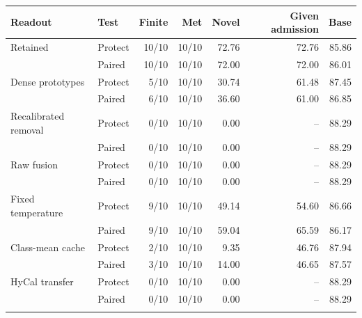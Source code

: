 \begin{tabular}{@{}llrrrrr@{}}
\toprule
Readout & Test & Finite & Met & Novel & Given admission & Base \\
\midrule
Retained & Protect & 10/10 & 10/10 & 72.76 & 72.76 & 85.86 \\
 & Paired & 10/10 & 10/10 & 72.00 & 72.00 & 86.01 \\
\addlinespace[2pt]
Dense prototypes & Protect & 5/10 & 10/10 & 30.74 & 61.48 & 87.45 \\
 & Paired & 6/10 & 10/10 & 36.60 & 61.00 & 86.85 \\
\addlinespace[2pt]
Recalibrated removal & Protect & 0/10 & 10/10 & 0.00 & -- & 88.29 \\
 & Paired & 0/10 & 10/10 & 0.00 & -- & 88.29 \\
\addlinespace[2pt]
Raw fusion & Protect & 0/10 & 10/10 & 0.00 & -- & 88.29 \\
 & Paired & 0/10 & 10/10 & 0.00 & -- & 88.29 \\
\addlinespace[2pt]
Fixed temperature & Protect & 9/10 & 10/10 & 49.14 & 54.60 & 86.66 \\
 & Paired & 9/10 & 10/10 & 59.04 & 65.59 & 86.17 \\
\addlinespace[2pt]
Class-mean cache & Protect & 2/10 & 10/10 & 9.35 & 46.76 & 87.94 \\
 & Paired & 3/10 & 10/10 & 14.00 & 46.65 & 87.57 \\
\addlinespace[2pt]
HyCal transfer & Protect & 0/10 & 10/10 & 0.00 & -- & 88.29 \\
 & Paired & 0/10 & 10/10 & 0.00 & -- & 88.29 \\
\addlinespace[2pt]
\bottomrule
\end{tabular}
